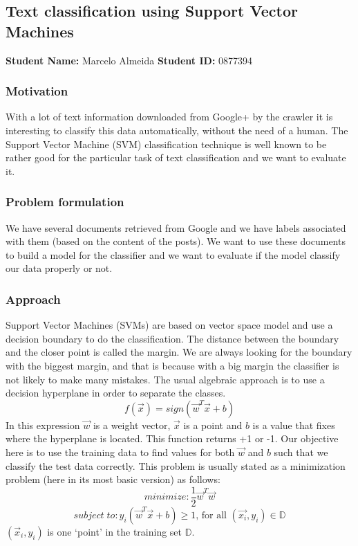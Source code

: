 \subsection{Text classification using Support Vector Machines}
\textbf{Student Name: }Marcelo Almeida \textbf{Student ID:} 0877394 \\

\subsubsection*{Motivation}
With a lot of text information downloaded from Google+ by the crawler it is interesting to classify this data automatically, without the need of a human. The Support Vector Machine (SVM) classification technique is well known to be rather good for the particular task of text classification and we want to evaluate it.


\subsubsection*{Problem formulation}
We have several documents retrieved from Google and we have labels associated with them (based on the content of the posts). We want to use these documents to build a model for the classifier and we want to evaluate if the model classify our data properly or not.


\subsubsection*{Approach}
Support Vector Machines (SVMs) are based on vector space model and use a decision boundary to do the classification. The distance between the boundary and the closer point is called the margin. We are always looking for the boundary with the biggest margin, and that is because with a big margin the classifier is not likely to make many mistakes. The usual algebraic approach is to use a decision hyperplane in order to separate the classes.
$$ f(\vec{x}) = sign(\vec{w}^{T} \vec{x} + b) $$
In this expression $\vec{w}$ is a weight vector, $ \vec{x}$ is a point and $b$ is a value that fixes where the hyperplane is located. This function returns +1 or -1. Our objective here is to use the training data to find values for both $\vec{w}$ and $b$ such that we classify the test data correctly. This problem is usually stated as a minimization problem (here in its most basic version) as follows:
$$ minimize: \dfrac{1}{2} \vec{w}^{T} \vec{w} $$
$$ subject \; to: y_{i}(\vec{w}^{T} \vec{x} + b) \geq 1 \text{, for all }(\vec{x_{i}},y_{i}) \in \mathbb{D} $$
$(\vec{x}_{i}, y_{i})$ is one ‘point’ in the training set $\mathbb{D}$.
 
